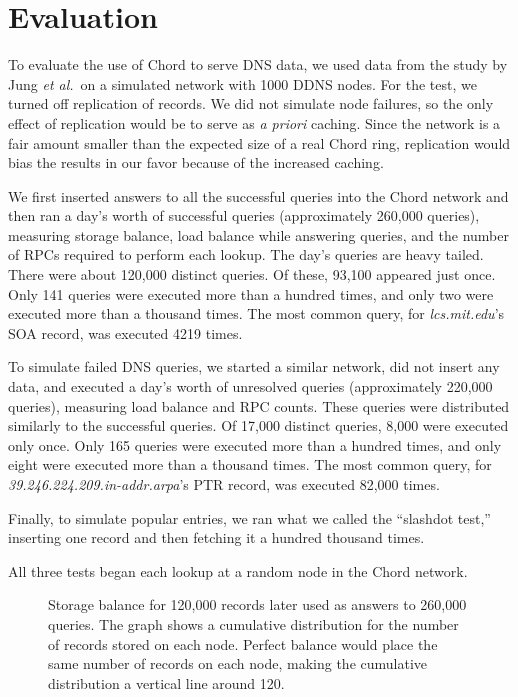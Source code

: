 \section{Evaluation}

To evaluate the use of Chord to serve DNS data,
we used data from the study by Jung {\em et al.}\ on
a simulated network with 1000 DDNS nodes.
For the test, we turned off replication of records.
We did not simulate node failures,
so the only effect of replication would be to serve
as {\em a priori} caching.
Since the network is a fair amount smaller than the expected
size of a real Chord ring, replication would
bias the results in our favor because of the increased caching.

We first inserted answers to all the successful queries into the Chord network
and then ran a day's worth of successful queries
(approximately 260,000 queries),
measuring storage balance, load balance while answering
queries, and the number of RPCs required to perform each lookup.
The day's queries are heavy tailed.
There were about 120,000 distinct queries.  Of these, 93,100 appeared
just once.
Only 141 queries were executed more than a hundred times,
and only two were executed more than a thousand times.
The most common query, for {\em lcs.mit.edu}'s SOA record,
was executed 4219 times.

To simulate failed DNS queries, we started a similar network, did not insert
any data, and executed a day's worth of unresolved queries (approximately
220,000 queries), measuring
load balance and RPC counts.
These queries were distributed similarly to the successful queries.
Of 17,000 distinct queries, 8,000 were executed only once.
Only 165 queries were executed more than a hundred times,
and only eight were executed more than a thousand times.
The most common query, for {\em 39.246.224.209.in-addr.arpa}'s
PTR record, was executed 82,000 times.

Finally, to simulate popular entries, we ran what we called the ``slashdot test,''
inserting one record and then fetching it a hundred thousand times.

All three tests began each lookup at a random node in the Chord network.

\begin{figure}[h]
\caption{
Storage balance for 120,000 records later used as answers to
260,000 queries.
The graph shows a cumulative distribution for the number 
of records stored on each node.
Perfect balance would place the same number of records
on each node, making the cumulative distribution a vertical line
around 120.}
\label{fig:store}
\end{figure}

